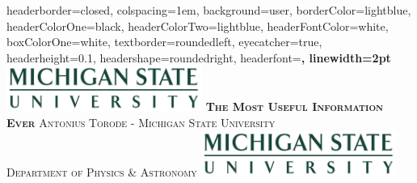 \documentclass[landscape,a0paper,fontscale=0.28]{baposter} %
\begin{document}
\begin{poster}
{
headerborder=closed, %
colspacing=1em, %
background=user,
borderColor=lightblue, %
headerColorOne=black, %
headerColorTwo=lightblue, %
headerFontColor=white, %
boxColorOne=white, %
textborder=roundedleft, %
eyecatcher=true, %
headerheight=0.1\textheight, %
headershape=roundedright, %
headerfont=\Large\bf\textsc, %
linewidth=2pt %
}
%
{\includegraphics[height=4em]{MSU.jpg}} %
{\bf\textsc{The Most Useful Information Ever}\vspace{0.5em}} %
{\textsc{Antonius Torode -  \hspace{12pt} Michigan State University \\ Department of Physics \& Astronomy}} %
{\includegraphics[height=4em]{MSU.jpg}} %



\end{poster}
\end{document}
